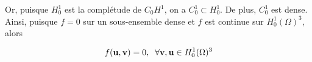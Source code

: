 \documentclass[letterpaper,12pt,oneside,final]{book}
\begin{document}
Or, puisque \( H_{0}^{1} \) est la complétude de \( C_{0}H^{1} \), on a \( C_{0}^{1} \subset H_{0}^{1} \). 
De plus, \( C_{0}^{1} \) est dense. \\
Ainsi, puisque \( f = 0  \) sur un sous-ensemble dense et \( f \) est continue sur \( H_{0}^{1}(\Omega )^{3} \), alors 

\[ f(\vb{u},\vb{v}) = 0,\;\; \forall \vb{v},\vb{u} \in H_{0}^{1}(\Omega )^{3} \]



\end{document}
